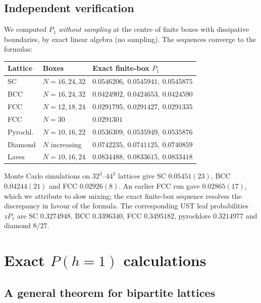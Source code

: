 \documentclass[aps,pre,10pt,twocolumn,superscriptaddress,nofootinbib]{revtex4-2}
\begin{document}
\subsection{Independent verification}

We computed $P_1$ \emph{without sampling} at the centre of finite boxes with dissipative
boundaries, by exact linear algebra (no sampling). The sequences converge to the formulas:
\begin{center}
\footnotesize
\begin{tabular}{lll}
\toprule
Lattice & Boxes & Exact finite-box $P_1$\\
\midrule
SC & $N=16,24,32$ & $0.0546206,\ 0.0545941,\ 0.0545875$\\
BCC & $N=16,24,32$ & $0.0424902,\ 0.0424653,\ 0.0424590$\\
FCC & $N=12,18,24$ & $0.0291795,\ 0.0291427,\ 0.0291335$\\
FCC & $N=30$ & $0.0291301$\\
Pyrochl. & $N=10,16,22$ & $0.0536309,\ 0.0535949,\ 0.0535876$\\
Diamond & $N$ increasing & $0.0742235,\ 0.0741125,\ 0.0740859$\\
Laves & $N=10,16,24$ & $0.0834488,\ 0.0833615,\ 0.0833418$\\
\bottomrule
\end{tabular}
\end{center}
Monte Carlo simulations on $32^3$--$44^3$ lattices give SC $0.05451(23)$, BCC $0.04244(21)$ and
FCC $0.02926(8)$. An earlier FCC run gave $0.02865(17)$, which we attribute to slow mixing; the exact
finite-box sequence resolves the discrepancy in favour of the formula. The corresponding UST leaf
probabilities $zP_1$ are SC $0.3274948$, BCC $0.3396340$, FCC $0.3495182$, pyrochlore $0.3214977$
and diamond $8/27$.

\section{Exact $P(h=1)$ calculations}
\label{sec:p1}

\subsection{A general theorem for bipartite lattices}
\label{sec:bip}
\end{document}
